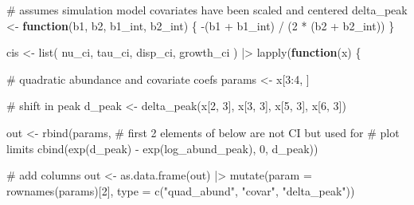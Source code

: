 \documentclass[
  letterpaper,
  DIV=11,
  numbers=noendperiod]{scrartcl}
\newenvironment{Shaded}{\begin{snugshade}}{\end{snugshade}}
\newcommand{\AttributeTok}[1]{\textcolor[rgb]{0.40,0.45,0.13}{#1}}
\newcommand{\CommentTok}[1]{\textcolor[rgb]{0.37,0.37,0.37}{#1}}
\newcommand{\ControlFlowTok}[1]{\textcolor[rgb]{0.00,0.23,0.31}{\textbf{#1}}}
\newcommand{\DecValTok}[1]{\textcolor[rgb]{0.68,0.00,0.00}{#1}}
\newcommand{\FunctionTok}[1]{\textcolor[rgb]{0.28,0.35,0.67}{#1}}
\newcommand{\NormalTok}[1]{\textcolor[rgb]{0.00,0.23,0.31}{#1}}
\newcommand{\OtherTok}[1]{\textcolor[rgb]{0.00,0.23,0.31}{#1}}
\newcommand{\SpecialCharTok}[1]{\textcolor[rgb]{0.37,0.37,0.37}{#1}}
\newcommand{\StringTok}[1]{\textcolor[rgb]{0.13,0.47,0.30}{#1}}
\begin{document}
\begin{Shaded}
\begin{Highlighting}[]
\CommentTok{\# assumes simulation model covariates have been scaled and centered}
\NormalTok{delta\_peak }\OtherTok{\textless{}{-}} \ControlFlowTok{function}\NormalTok{(b1, b2, b1\_int, b2\_int) \{}
    \SpecialCharTok{{-}}\NormalTok{(b1 }\SpecialCharTok{+}\NormalTok{ b1\_int) }\SpecialCharTok{/}\NormalTok{ (}\DecValTok{2} \SpecialCharTok{*}\NormalTok{ (b2 }\SpecialCharTok{+}\NormalTok{ b2\_int))}
\NormalTok{\}}


\NormalTok{cis }\OtherTok{\textless{}{-}} \FunctionTok{list}\NormalTok{(}
\NormalTok{    nu\_ci,}
\NormalTok{    tau\_ci,}
\NormalTok{    disp\_ci,}
\NormalTok{    growth\_ci}
\NormalTok{) }\SpecialCharTok{|\textgreater{}} 
    \FunctionTok{lapply}\NormalTok{(}\ControlFlowTok{function}\NormalTok{(x) \{}
        
        \CommentTok{\# quadratic abundance and covariate coefs}
\NormalTok{        params }\OtherTok{\textless{}{-}}\NormalTok{ x[}\DecValTok{3}\SpecialCharTok{:}\DecValTok{4}\NormalTok{, ]}
        
        \CommentTok{\# shift in peak}
\NormalTok{        d\_peak }\OtherTok{\textless{}{-}} \FunctionTok{delta\_peak}\NormalTok{(x[}\DecValTok{2}\NormalTok{, }\DecValTok{3}\NormalTok{], x[}\DecValTok{3}\NormalTok{, }\DecValTok{3}\NormalTok{], x[}\DecValTok{5}\NormalTok{, }\DecValTok{3}\NormalTok{], x[}\DecValTok{6}\NormalTok{, }\DecValTok{3}\NormalTok{])}
        
\NormalTok{        out }\OtherTok{\textless{}{-}} \FunctionTok{rbind}\NormalTok{(params, }
                     \CommentTok{\# first 2 elements of below are not CI but used for }
                     \CommentTok{\# plot limits}
                     \FunctionTok{cbind}\NormalTok{(}\FunctionTok{exp}\NormalTok{(d\_peak) }\SpecialCharTok{{-}} \FunctionTok{exp}\NormalTok{(log\_abund\_peak), }
                           \DecValTok{0}\NormalTok{, }
\NormalTok{                           d\_peak))}
        
        
        \CommentTok{\# add columns}
\NormalTok{        out }\OtherTok{\textless{}{-}} \FunctionTok{as.data.frame}\NormalTok{(out) }\SpecialCharTok{|\textgreater{}} 
            \FunctionTok{mutate}\NormalTok{(}\AttributeTok{param =} \FunctionTok{rownames}\NormalTok{(params)[}\DecValTok{2}\NormalTok{], }
                   \AttributeTok{type =} \FunctionTok{c}\NormalTok{(}\StringTok{"quad\_abund"}\NormalTok{, }\StringTok{"covar"}\NormalTok{, }\StringTok{"delta\_peak"}\NormalTok{))}
        

\end{Highlighting}
\end{Shaded}
\end{document}
